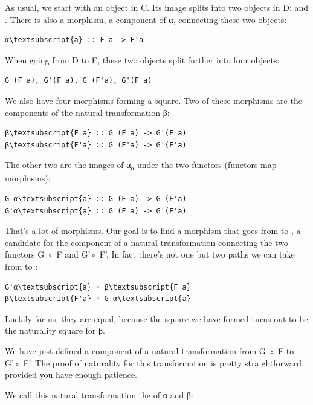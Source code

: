 \noindent
As usual, we start with an object  in C. Its image splits into
two objects in D:  and . There is also a
morphism, a component of α, connecting these two objects:

\begin{Verbatim}[commandchars=\\\{\}]
α\textsubscript{a} :: F a -> F'a
\end{Verbatim}
When going from D to E, these two objects split further into four
objects:

\begin{verbatim}
G (F a), G'(F a), G (F'a), G'(F'a)
\end{verbatim}
We also have four morphisms forming a square. Two of these morphisms are
the components of the natural transformation β:

\begin{Verbatim}[commandchars=\\\{\}]
β\textsubscript{F a} :: G (F a) -> G'(F a)
β\textsubscript{F'a} :: G (F'a) -> G'(F'a)
\end{Verbatim}
The other two are the images of α\textsubscript{a} under the two
functors (functors map morphisms):

\begin{Verbatim}[commandchars=\\\{\}]
G α\textsubscript{a} :: G (F a) -> G (F'a)
G'α\textsubscript{a} :: G'(F a) -> G'(F'a)
\end{Verbatim}
That's a lot of morphisms. Our goal is to find a morphism that goes from
 to , a candidate for the
component of a natural transformation connecting the two functors G ◦ F
and G'◦ F'. In fact there's not one but two paths we can take from
 to :

\begin{Verbatim}[commandchars=\\\{\}]
G'α\textsubscript{a} ◦ β\textsubscript{F a}
β\textsubscript{F'a} ◦ G α\textsubscript{a}
\end{Verbatim}
Luckily for us, they are equal, because the square we have formed turns
out to be the naturality square for β.

We have just defined a component of a natural transformation from G ◦ F
to G'◦ F'. The proof of naturality for this transformation is pretty
straightforward, provided you have enough patience.

We call this natural transformation the  of
α and β:

